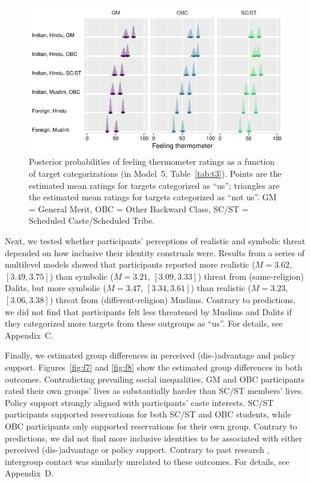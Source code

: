 \documentclass[12pt, a4paper]{article}
\begin{document}
\begin{figure}
\centering
\includegraphics[scale=1]{../figures/figure-6}
\caption{
Posterior probabilities of feeling thermometer ratings as a function of target categorizations (in Model~5, Table~\ref{tab:t3}). Points are the estimated mean ratings for targets categorized as ``us''; triangles are the estimated mean ratings for targets categorized as ``not us''. GM = General Merit, OBC = Other Backward Class, SC/ST = Scheduled Caste/Scheduled Tribe.
}
\label{fig:f6}
\end{figure}

Next, we tested whether participants' perceptions of realistic and symbolic threat depended on how inclusive their identity construals were. Results from a series of multilevel models showed that participants reported more realistic ($M = 3.62$, $[3.49, 3.75]$) than symbolic ($M = 3.21$, $[3.09, 3.33]$) threat from (same-religion) Dalits, but more symbolic ($M = 3.47$, $[3.34, 3.61]$) than realistic ($M = 3.23$, $[3.06, 3.38]$) threat from (different-religion) Muslims. Contrary to predictions, we did not find that participants felt less threatened by Muslims and Dalits if they categorized more targets from these outgroups as ``us''. For details, see Appendix~C.

Finally, we estimated group differences in perceived (dis-)advantage and policy support. Figures~\ref{fig:f7} and \ref{fig:f8} show the estimated group differences in both outcomes. Contradicting prevailing social inequalities, GM and OBC participants rated their own groups' lives as substantially harder than SC/ST members' lives. Policy support strongly aligned with participants' caste interests. SC/ST participants supported reservations for both SC/ST and OBC students, while OBC participants only supported reservations for their own group. Contrary to predictions, we did not find more inclusive identities to be associated with either perceived (dis-)advantage or policy support. Contrary to past research \cite{dixon_beyond_2012}, intergroup contact was similarly unrelated to these outcomes. For details, see Appendix~D.
\end{document}
